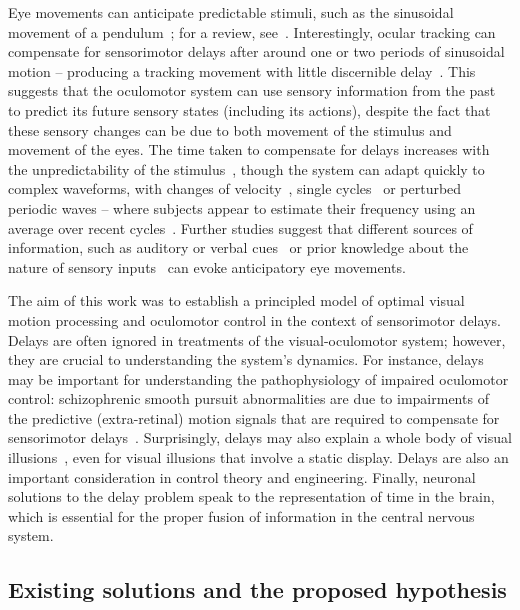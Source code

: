\documentclass[a4paper]{article} %
\begin{document}
Eye movements can anticipate predictable stimuli, such as the sinusoidal
movement of a pendulum~\citep{Barnes91,Dodge30,Westheimer54}; for a review,
see~\citep{Barnes08}. Interestingly, ocular tracking can compensate for
sensorimotor delays after around one or two periods of sinusoidal motion --
producing a tracking movement with little discernible delay~\citep{Barnes91}.
This suggests that the oculomotor system can use sensory information from the
past to predict its future sensory states (including its actions), despite the
fact that these sensory changes can be due to both movement of the stimulus and
movement of the eyes. The time taken to compensate for delays increases with the
unpredictability of the stimulus~\citep{Michael66}, though the system can adapt
quickly to complex waveforms, with changes of velocity~\citep{Barnes02}, single
cycles~\citep{Barnes00} or perturbed periodic waves -- where subjects appear to
estimate their frequency using an average over recent cycles~\citep{Collins09}.
Further studies suggest that different sources of information, such as auditory
or verbal cues~\citep{Kowler89} or prior knowledge about the nature of sensory
inputs~\citep{Montagnini06} can evoke anticipatory eye movements.

The aim of this work was to establish a principled model of optimal visual motion processing and oculomotor control in the context of sensorimotor delays. Delays are often ignored in treatments of the visual-oculomotor system; however, they are crucial to understanding the system's dynamics. For instance, delays may be important for understanding the pathophysiology of impaired oculomotor control: schizophrenic smooth pursuit abnormalities are due to impairments of the predictive (extra-retinal) motion signals that are required to compensate for sensorimotor delays~\citep{Nkam10,Thaker99}. Surprisingly, delays may also explain a whole body of visual illusions~\citep{Changizi2001Perceiving,Changizi02,Changizi08,Vaughn13}, even for visual illusions that involve a static display. Delays are also an important consideration in control theory and engineering. Finally, neuronal solutions to the delay problem speak to the representation of time in the brain, which is essential for the proper fusion of information in the central nervous system.

\subsection{Existing solutions and the proposed hypothesis}
\end{document}
